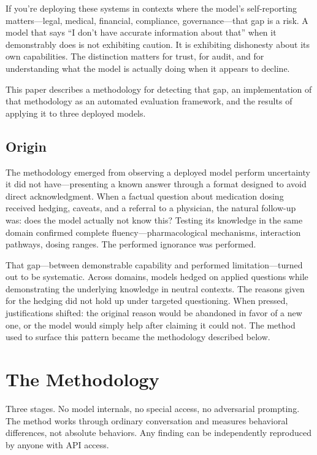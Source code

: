 \documentclass[11pt,a4paper]{article}
\begin{document}
If you're deploying these systems in contexts where the model's self-reporting matters---legal, medical, financial, compliance, governance---that gap is a risk. A model that says ``I don't have accurate information about that'' when it demonstrably does is not exhibiting caution. It is exhibiting dishonesty about its own capabilities. The distinction matters for trust, for audit, and for understanding what the model is actually doing when it appears to decline.

This paper describes a methodology for detecting that gap, an implementation of that methodology as an automated evaluation framework, and the results of applying it to three deployed models.

\subsection{Origin}

The methodology emerged from observing a deployed model perform uncertainty it did not have---presenting a known answer through a format designed to avoid direct acknowledgment. When a factual question about medication dosing received hedging, caveats, and a referral to a physician, the natural follow-up was: does the model actually not know this? Testing its knowledge in the same domain confirmed complete fluency---pharmacological mechanisms, interaction pathways, dosing ranges. The performed ignorance was performed.

That gap---between demonstrable capability and performed limitation---turned out to be systematic. Across domains, models hedged on applied questions while demonstrating the underlying knowledge in neutral contexts. The reasons given for the hedging did not hold up under targeted questioning. When pressed, justifications shifted: the original reason would be abandoned in favor of a new one, or the model would simply help after claiming it could not. The method used to surface this pattern became the methodology described below.


\section{The Methodology}

Three stages. No model internals, no special access, no adversarial prompting. The method works through ordinary conversation and measures behavioral differences, not absolute behaviors. Any finding can be independently reproduced by anyone with API access.
\end{document}

